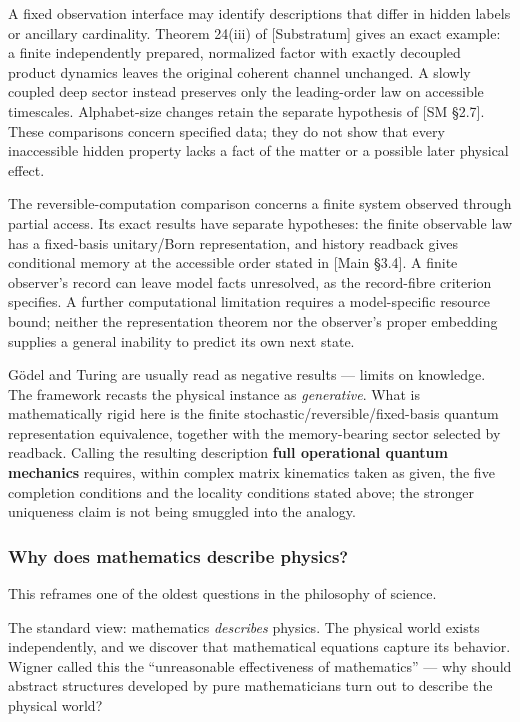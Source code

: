 \documentclass[
]{article}
\begin{document}
A fixed observation interface may identify descriptions that differ in
hidden labels or ancillary cardinality. Theorem 24(iii) of
{[}Substratum{]} gives an exact example: a finite independently
prepared, normalized factor with exactly decoupled product dynamics
leaves the original coherent channel unchanged. A slowly coupled deep
sector instead preserves only the leading-order law on accessible
timescales. Alphabet-size changes retain the separate hypothesis of
{[}SM §2.7{]}. These comparisons concern specified data; they do not
show that every inaccessible hidden property lacks a fact of the matter
or a possible later physical effect.

The reversible-computation comparison concerns a finite system observed
through partial access. Its exact results have separate hypotheses: the
finite observable law has a fixed-basis unitary/Born representation, and
history readback gives conditional memory at the accessible order stated
in {[}Main §3.4{]}. A finite observer's record can leave model facts
unresolved, as the record-fibre criterion specifies. A further
computational limitation requires a model-specific resource bound;
neither the representation theorem nor the observer's proper embedding
supplies a general inability to predict its own next state.

Gödel and Turing are usually read as negative results --- limits on
knowledge. The framework recasts the physical instance as
\emph{generative}. What is mathematically rigid here is the finite
stochastic/reversible/fixed-basis quantum representation equivalence,
together with the memory-bearing sector selected by readback. Calling
the resulting description \textbf{full operational quantum mechanics}
requires, within complex matrix kinematics taken as given, the five
completion conditions and the locality conditions stated above; the
stronger uniqueness claim is not being smuggled into the analogy.

\hypertarget{why-does-mathematics-describe-physics}{%
\subsubsection{Why does mathematics describe
physics?}\label{why-does-mathematics-describe-physics}}

This reframes one of the oldest questions in the philosophy of science.

The standard view: mathematics \emph{describes} physics. The physical
world exists independently, and we discover that mathematical equations
capture its behavior. Wigner called this the ``unreasonable
effectiveness of mathematics'' --- why should abstract structures
developed by pure mathematicians turn out to describe the physical
world?
\end{document}
